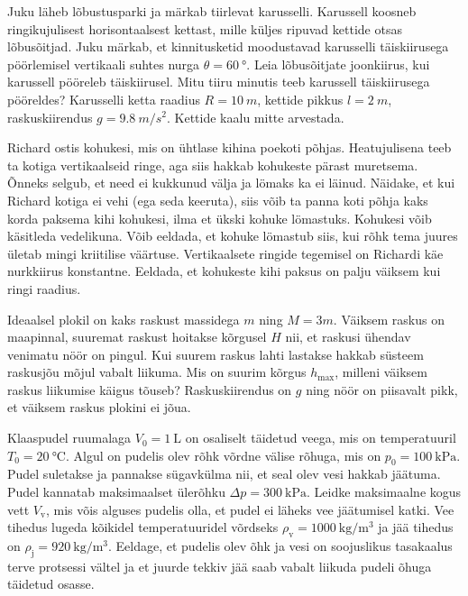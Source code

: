 \documentclass[10pt]{article}
\begin{document}
\setAuthor{}

Juku läheb lõbustusparki ja märkab tiirlevat karusselli. Karussell koosneb ringikujulisest horisontaalsest kettast, mille küljes ripuvad kettide otsas lõbusõitjad. Juku märkab, et kinnitusketid moodustavad karusselli täiskiirusega pöörlemisel vertikaali suhtes nurga $\theta = \SI{60}{\degree}$.  Leia lõbusõitjate joonkiirus, kui karussell pööreleb täiskiirusel. Mitu tiiru minutis teeb karussell täiskiirusega pööreldes? Karusselli ketta raadius $R=\SI{10}{m}$, kettide pikkus $l=\SI{2}{m}$, raskuskiirendus $g=\SI{9,8}{m / s^2}$. Kettide kaalu mitte arvestada.
\probend
\bigskip

\setAuthor{}

Richard ostis kohukesi, mis on ühtlase kihina poekoti põhjas. Heatujulisena teeb
ta kotiga vertikaalseid ringe, aga siis hakkab kohukeste pärast muretsema. Õnneks
selgub, et need ei kukkunud välja ja lömaks ka ei läinud. Näidake, et kui Richard
kotiga ei vehi (ega seda keeruta), siis võib ta panna koti põhja kaks korda
paksema kihi kohukesi, ilma et ükski kohuke lömastuks. Kohukesi võib käsitleda
vedelikuna. Võib eeldada, et kohuke lömastub siis, kui rõhk tema juures ületab
mingi kriitilise väärtuse. Vertikaalsete ringide tegemisel on Richardi käe
nurkkiirus konstantne. Eeldada, et kohukeste kihi paksus on palju väiksem kui
ringi raadius.
\probend
\bigskip


Ideaalsel plokil on kaks raskust massidega $m$ ning $M=3m$. Väiksem raskus on maapinnal, suuremat raskust hoitakse kõrgusel $H$ nii, et raskusi ühendav venimatu nöör on pingul. Kui suurem raskus lahti lastakse hakkab süsteem raskusjõu mõjul vabalt liikuma. Mis on suurim kõrgus $h_\text{max}$, milleni väiksem raskus liikumise käigus tõuseb? Raskuskiirendus on $g$ ning nöör on piisavalt pikk, et väiksem raskus plokini ei jõua.
\probend
\bigskip


Klaaspudel ruumalaga $V_0=\SI{1}{\liter}$ on osaliselt täidetud veega, mis on temperatuuril $T_0=\SI{20}{\celsius}$. Algul on pudelis olev rõhk võrdne välise rõhuga, mis on $p_0=\SI{100}{\kilo\pascal}$. Pudel suletakse ja pannakse sügavkülma nii, et seal olev vesi hakkab jäätuma. Pudel kannatab maksimaalset ülerõhku $\Delta p=\SI{300}{\kilo\pascal}$. Leidke maksimaalne kogus vett $V_{\text{v}}$, mis võis alguses pudelis olla, et pudel ei läheks vee jäätumisel katki. Vee tihedus lugeda kõikidel temperatuuridel võrdseks $\rho_{\text{v}}=\SI{1000}{\kilo\gram\per\meter\cubed}$ ja jää tihedus on $\rho_{\text{j}}=\SI{920}{\kilo\gram\per\meter\cubed}$. Eeldage, et pudelis olev õhk ja vesi on soojuslikus tasakaalus terve protsessi vältel ja et juurde tekkiv jää saab vabalt liikuda pudeli õhuga täidetud osasse.
\end{document}
